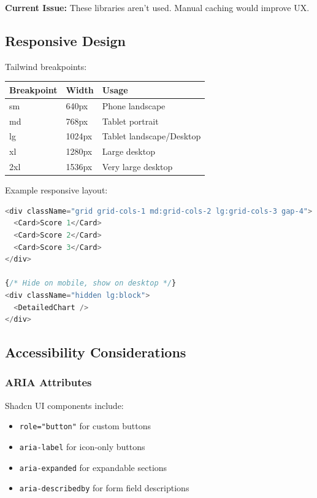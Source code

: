 \documentclass[12pt,a4paper,oneside]{article}
\begin{document}
\textbf{Current Issue:} These libraries aren't used. Manual caching would improve UX.

\subsection{Responsive Design}

Tailwind breakpoints:

\begin{table}[H]
\centering
\begin{tabular}{|p{2cm}|p{2cm}|p{10cm}|}
\hline
\textbf{Breakpoint} & \textbf{Width} & \textbf{Usage} \\
\hline
sm & 640px & Phone landscape \\
\hline
md & 768px & Tablet portrait \\
\hline
lg & 1024px & Tablet landscape/Desktop \\
\hline
xl & 1280px & Large desktop \\
\hline
2xl & 1536px & Very large desktop \\
\hline
\end{tabular}
\end{table}

Example responsive layout:

\begin{lstlisting}[language=JavaScript, caption=Responsive Design]
<div className="grid grid-cols-1 md:grid-cols-2 lg:grid-cols-3 gap-4">
  <Card>Score 1</Card>
  <Card>Score 2</Card>
  <Card>Score 3</Card>
</div>

{/* Hide on mobile, show on desktop */}
<div className="hidden lg:block">
  <DetailedChart />
</div>
\end{lstlisting}

\subsection{Accessibility Considerations}

\subsubsection{ARIA Attributes}

Shadcn UI components include:

\begin{itemize}
    \item \texttt{role="button"} for custom buttons
    \item \texttt{aria-label} for icon-only buttons
    \item \texttt{aria-expanded} for expandable sections
    \item \texttt{aria-describedby} for form field descriptions
\end{itemize}
\end{document}
